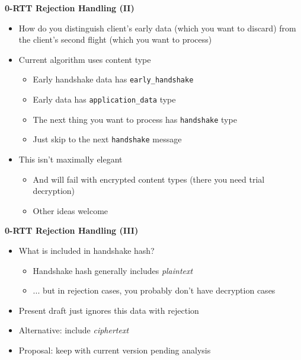 \documentclass[helvetica]{seminar}
\newcommand{\heading}[1]{%
  \begin{center} 
    \large\bf 
    #1 
  \end{center} 
  \vspace{.4 in}}
\begin{document}
\begin{slide}
\heading{0-RTT Rejection Handling (II)}

\vspace{-2ex}
\begin{itemize}
\item How do you distinguish client's early data (which you want to discard) from the client's second flight (which you want to process)
\item Current algorithm uses content type
  \begin{itemize}
  \item Early handshake data has \verb^early_handshake^
  \item Early data has \verb^application_data^ type
  \item The next thing you want to process has \verb^handshake^ type
  \item Just skip to the next \verb^handshake^ message
  \end{itemize}
\item This isn't maximally elegant
  \begin{itemize}
  \item And will fail with encrypted content types (there you need trial decryption)
  \item Other ideas welcome
  \end{itemize}
\end{itemize}
\end{slide}


\begin{slide}
\heading{0-RTT Rejection Handling (III)}

\begin{itemize}
\item What is included in handshake hash?
  \begin{itemize}
  \item Handshake hash generally includes \emph{plaintext}
  \item ... but in rejection cases, you probably don't have decryption cases
  \end{itemize}

\item Present draft just ignores this data with rejection
\item Alternative: include \emph{ciphertext}
\item Proposal: keep with current version pending analysis
\end{itemize}
\end{slide}
\end{document}
